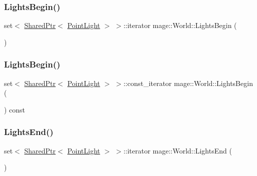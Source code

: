 \subsubsection{\texorpdfstring{Lights\+Begin()}{LightsBegin()}\hspace{0.1cm}{\footnotesize\ttfamily [1/2]}}
{\footnotesize\ttfamily set$<$ \hyperlink{namespacemage_a1e01ae66713838a7a67d30e44c67703e}{Shared\+Ptr}$<$ \hyperlink{classmage_1_1_point_light}{Point\+Light} $>$ $>$\+::iterator mage\+::\+World\+::\+Lights\+Begin (\begin{DoxyParamCaption}{ }\end{DoxyParamCaption})}

\hypertarget{classmage_1_1_world_a45b3876de39fd5d7bd176f029cf4c535}{}\label{classmage_1_1_world_a45b3876de39fd5d7bd176f029cf4c535} 
\subsubsection{\texorpdfstring{Lights\+Begin()}{LightsBegin()}\hspace{0.1cm}{\footnotesize\ttfamily [2/2]}}
{\footnotesize\ttfamily set$<$ \hyperlink{namespacemage_a1e01ae66713838a7a67d30e44c67703e}{Shared\+Ptr}$<$ \hyperlink{classmage_1_1_point_light}{Point\+Light} $>$ $>$\+::const\+\_\+iterator mage\+::\+World\+::\+Lights\+Begin (\begin{DoxyParamCaption}{ }\end{DoxyParamCaption}) const}

\hypertarget{classmage_1_1_world_a52c035bf11269bb9cc6fb537532bfeab}{}\label{classmage_1_1_world_a52c035bf11269bb9cc6fb537532bfeab} 
\subsubsection{\texorpdfstring{Lights\+End()}{LightsEnd()}\hspace{0.1cm}{\footnotesize\ttfamily [1/2]}}
{\footnotesize\ttfamily set$<$ \hyperlink{namespacemage_a1e01ae66713838a7a67d30e44c67703e}{Shared\+Ptr}$<$ \hyperlink{classmage_1_1_point_light}{Point\+Light} $>$ $>$\+::iterator mage\+::\+World\+::\+Lights\+End (\begin{DoxyParamCaption}{ }\end{DoxyParamCaption})}

